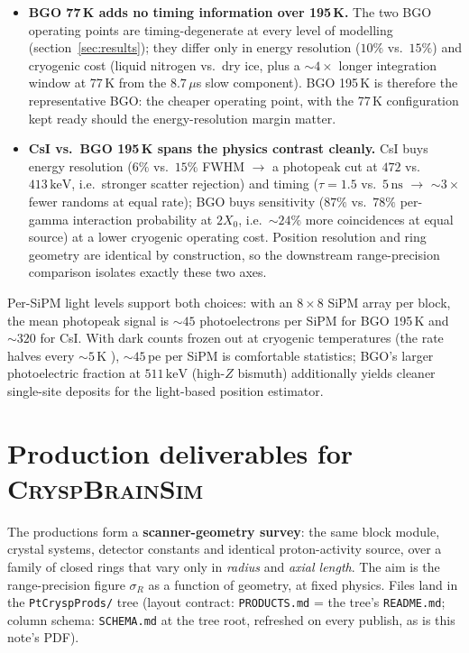 \documentclass[11pt,a4paper]{article}
\newcommand{\ns}{\,\mathrm{ns}}
\newcommand{\keV}{\,\mathrm{keV}}
\begin{document}
\begin{itemize}
\item \textbf{BGO 77\,K adds no timing information over 195\,K.} The two BGO operating points
  are timing-degenerate at every level of modelling (section~\ref{sec:results}); they differ
  only in energy resolution ($10\%$ vs.\ $15\%$) and cryogenic cost (liquid nitrogen vs.\ dry
  ice, plus a ${\sim}4\times$ longer integration window at 77\,K from the $8.7\,\mu$s slow
  component). BGO 195\,K is therefore the representative BGO: the cheaper operating point,
  with the 77\,K configuration kept ready should the energy-resolution margin matter.
\item \textbf{CsI vs.\ BGO 195\,K spans the physics contrast cleanly.} CsI buys energy
  resolution ($6\%$ vs.\ $15\%$ FWHM $\to$ a photopeak cut at $472$ vs.\ $413\keV$, i.e.\
  stronger scatter rejection) and timing ($\tau = 1.5$ vs.\ $5\ns$ $\to$ ${\sim}3\times$ fewer
  randoms at equal rate); BGO buys sensitivity ($87\%$ vs.\ $78\%$ per-gamma interaction
  probability at $2X_0$, i.e.\ ${\sim}24\%$ more coincidences at equal source) at a lower
  cryogenic operating cost. Position resolution and ring geometry are identical by
  construction, so the downstream range-precision comparison isolates exactly these two axes.
\end{itemize}

Per-SiPM light levels support both choices: with an $8\times8$ SiPM array per block, the mean
photopeak signal is ${\sim}45$ photoelectrons per SiPM for BGO 195\,K and ${\sim}320$ for CsI.
With dark counts frozen out at cryogenic temperatures (the rate halves every ${\sim}5$\,K
\cite{Soleti2024}), ${\sim}45$\,pe per SiPM is comfortable statistics; BGO's larger
photoelectric fraction at $511\keV$ (high-$Z$ bismuth) additionally yields cleaner single-site
deposits for the light-based position estimator.

\section{Production deliverables for \textsc{CryspBrainSim}}
\label{sec:deliverables}

The productions form a \textbf{scanner-geometry survey}: the same block module, crystal
systems, detector constants and identical proton-activity source, over a family of closed rings
that vary only in \emph{radius} and \emph{axial length}. The aim is the range-precision figure
$\sigma_R$ as a function of geometry, at fixed physics. Files land in the \texttt{PtCryspProds/}
tree (layout contract: \texttt{PRODUCTS.md} = the tree's \texttt{README.md}; column schema:
\texttt{SCHEMA.md} at the tree root, refreshed on every publish, as is this note's PDF).
\end{document}
